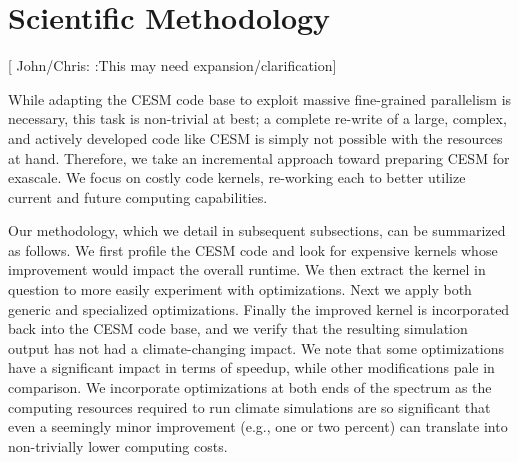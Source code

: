


\section{Scientific Methodology}\label{sec:method}

[{\color{red} John/Chris: }:This may need expansion/clarification]

While adapting the CESM code base to exploit massive fine-grained parallelism is necessary, this task is non-trivial at best; a complete re-write of a large, complex, and actively developed code like CESM is simply not possible with the resources at hand.  Therefore, we take an incremental approach toward preparing CESM for exascale. We focus on costly code kernels, re-working each to better utilize current and future computing capabilities.   

Our methodology, which we detail in subsequent subsections, can be summarized as follows.  We first profile the CESM code and look for expensive kernels whose improvement would impact the overall runtime.  We then extract the kernel in question to more easily experiment with optimizations. Next we apply both generic and specialized optimizations. Finally the improved kernel is incorporated back into the CESM code base, and we verify that the resulting simulation output has not had a climate-changing impact.  We note that some optimizations have a significant impact in terms of speedup, while other modifications pale in comparison. We incorporate optimizations at both ends of the spectrum as the computing resources required to run climate simulations are so significant that even a seemingly minor improvement (e.g., one or two percent) can translate into non-trivially lower computing costs.

